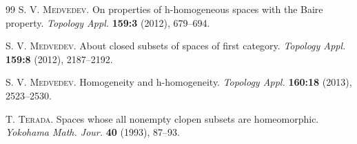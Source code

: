 \documentclass{amsart}
\theoremstyle{plain}
\theoremstyle{definition}
\begin{document}
\begin{thebibliography}{99}
\textsc{S. V. Medvedev.} On properties of h-homogeneous spaces with the Baire property. \emph{Topology Appl.} \textbf{159:3} (2012), 679--694.

\textsc{S. V. Medvedev.} About closed subsets of spaces of first category. \emph{Topology Appl.} \textbf{159:8} (2012), 2187--2192.

\textsc{S. V. Medvedev.} Homogeneity and h-homogeneity. \emph{Topology Appl.} \textbf{160:18} (2013), 2523--2530.

\textsc{T. Terada.} Spaces whose all nonempty clopen subsets are homeomorphic. \emph{Yokohama Math. Jour.} \textbf{40} (1993), 87--93.

\end{thebibliography}
\end{document}
